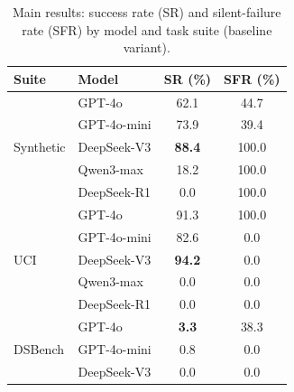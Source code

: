 \begin{table}[t]
\centering
\caption{Main results: success rate (SR) and silent-failure rate (SFR) by model and task suite (baseline variant).}
\label{tab:main-results}
\small
\begin{tabular}{@{}llcc@{}}
\toprule
Suite & Model & SR (\%) & SFR (\%) \\
\midrule
\multirow{5}{*}{Synthetic} & GPT-4o & 62.1 & 44.7 \\
 & GPT-4o-mini & 73.9 & 39.4 \\
 & DeepSeek-V3 & \textbf{88.4} & 100.0 \\
 & Qwen3-max & 18.2 & 100.0 \\
 & DeepSeek-R1 & 0.0 & 100.0 \\
\midrule
\multirow{5}{*}{UCI} & GPT-4o & 91.3 & 100.0 \\
 & GPT-4o-mini & 82.6 & 0.0 \\
 & DeepSeek-V3 & \textbf{94.2} & 0.0 \\
 & Qwen3-max & 0.0 & 0.0 \\
 & DeepSeek-R1 & 0.0 & 0.0 \\
\midrule
\multirow{3}{*}{DSBench} & GPT-4o & \textbf{3.3} & 38.3 \\
 & GPT-4o-mini & 0.8 & 0.0 \\
 & DeepSeek-V3 & 0.0 & 0.0 \\
\bottomrule
\end{tabular}
\end{table}

